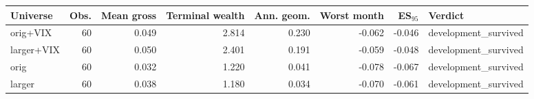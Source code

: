 \begin{tabular}{lrrrrrrl}
\toprule
Universe & Obs. & Mean gross & Terminal wealth & Ann. geom. & Worst month & ES$_{95}$ & Verdict \\
\midrule
orig+VIX & 60 & 0.049 & 2.814 & 0.230 & -0.062 & -0.046 & development\_survived \\
larger+VIX & 60 & 0.050 & 2.401 & 0.191 & -0.059 & -0.048 & development\_survived \\
orig & 60 & 0.032 & 1.220 & 0.041 & -0.078 & -0.067 & development\_survived \\
larger & 60 & 0.038 & 1.180 & 0.034 & -0.070 & -0.061 & development\_survived \\
\bottomrule
\end{tabular}
